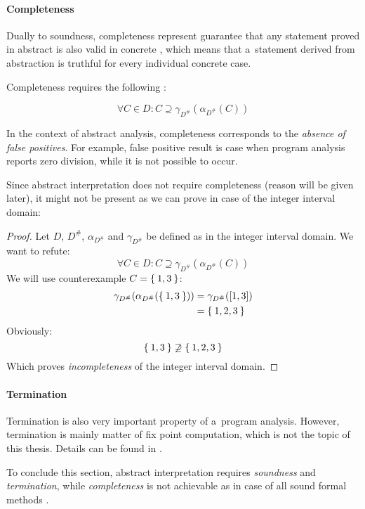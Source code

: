 \documentclass[12pt,oneside]{fithesis2}
\theoremstyle{definition}
\begin{document}
\paragraph{Completeness}
Dually to soundness, completeness represent guarantee that any statement proved in abstract is also valid in concrete \cite{mine-AIAA10}, which means that a~statement derived from abstraction is truthful for every individual concrete case.

Completeness requires the following \cite{mine-AIAA10}:

\[
  \forall C \in D: C \supseteq \gamma_{D^\#}(\alpha_{D^\#}(C))
\]

In the context of abstract analysis, completeness corresponds to the \textit{absence of false positives}. For example, false positive result is case when program analysis reports zero division, while it is not possible to occur.

Since abstract interpretation does not require completeness (reason will be given later), it might not be present as we can prove in case of the integer interval domain:

\begin{proof}
  Let $D$, $D^\#$, $\alpha_{D^\#}$ and $\gamma_{D^\#}$ be defined as in the integer interval domain. We want to refute:
  \[
    \forall C \in D: C \supseteq \gamma_{D^\#}(\alpha_{D^\#}(C))
  \]
  We will use counterexample $C = \Set{1, 3}$:
  \begin{align*}
    \gamma_{D^\#}(\alpha_{D^\#}(\Set{1, 3})) &= \gamma_{D^\#}([1, 3])\\
    &= \Set{1, 2, 3}
  \end{align*}
  Obviously:
  \[
    \Set{1, 3} \not\supseteq \Set{1, 2, 3}
  \]
  Which proves \textit{incompleteness} of the integer interval domain.
\end{proof}

\paragraph{Termination} Termination is also very important property of a~program analysis. However, termination is mainly matter of fix point computation, which is not the topic of this thesis. Details can be found in \cite{CousotCousot79-1}.

To conclude this section, abstract interpretation requires \textit{soundness} and \textit{termination}, while \textit{completeness} is not achievable as in case of all sound formal methods \cite{CousotEtAl06-ASIAN}.
\end{document}
